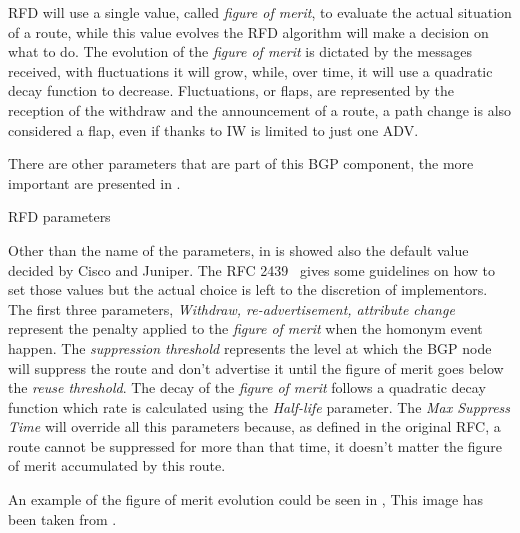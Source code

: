 \ac{RFD} will use a single value, called \textit{figure of merit}, to evaluate
the actual situation of a route, while this value evolves the \ac{RFD} algorithm
will make a decision on what to do.
The evolution of the \textit{figure of merit} is dictated by the messages received,
with fluctuations it will grow, while, over time, it will use a quadratic decay
function to decrease.
Fluctuations, or flaps, are represented by the reception of the withdraw and
the announcement of a route, a path change is also considered a flap, even
if thanks to \ac{IW} is limited to just one \ac{ADV}.

There are other parameters that are part of this \ac{BGP} component, the more
important are presented in .

\begin{table}[ht]
	
		\caption{\ac{RFD} parameters}
	\label{tbl:rfd_defaults}
\end{table}

Other than the name of the parameters, in  is showed also
the default value decided by Cisco and Juniper.
The \ac{RFC} \num{2439}~\cite{rfc2439} gives some guidelines on how to set those
values but the actual choice is left to the discretion of implementors.
The first three parameters, \textit{Withdraw, re-advertisement, attribute change}
represent the penalty applied to the \textit{figure of merit} when the homonym event
happen.
The \textit{suppression threshold} represents the level at which the \ac{BGP} node will
suppress the route and don't advertise it until the figure of merit goes
below the \textit{reuse threshold}.
The decay of the \textit{figure of merit} follows a quadratic decay function
which rate is calculated using the \textit{Half-life} parameter.
The \textit{Max Suppress Time} will override all this parameters because, as
defined in the original \ac{RFC}, a route cannot be suppressed for more than
that time, it doesn't matter the figure of merit accumulated by this route.

An example of the figure of merit evolution could be seen in ,
This image has been taken from \cite{gray2020bgp}.

